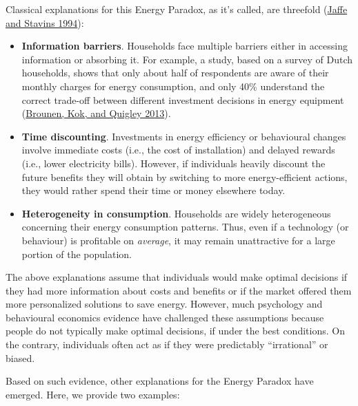 \documentclass[
  11pt,
  captions=heading]{scrreport}
\begin{document}
Classical explanations for this Energy Paradox, as it's called, are
threefold (\protect\hyperlink{ref-jaffe1994energy}{Jaffe and Stavins
1994}):

\begin{itemize}
\item
  \textbf{Information barriers}. Households face multiple barriers
  either in accessing information or absorbing it. For example, a study,
  based on a survey of Dutch households, shows that only about half of
  respondents are aware of their monthly charges for energy consumption,
  and only 40\% understand the correct trade-off between different
  investment decisions in energy equipment
  (\protect\hyperlink{ref-brounen2013energy}{Brounen, Kok, and Quigley
  2013}).
\item
  \textbf{Time discounting}. Investments in energy efficiency or
  behavioural changes involve immediate costs (i.e., the cost of
  installation) and delayed rewards (i.e., lower electricity bills).
  However, if individuals heavily discount the future benefits they will
  obtain by switching to more energy-efficient actions, they would
  rather spend their time or money elsewhere today.
\item
  \textbf{Heterogeneity in consumption}. Households are widely
  heterogeneous concerning their energy consumption patterns. Thus, even
  if a technology (or behaviour) is profitable on \emph{average}, it may
  remain unattractive for a large portion of the population.
\end{itemize}

The above explanations assume that individuals would make optimal
decisions if they had more information about costs and benefits or if
the market offered them more personalized solutions to save energy.
However, much psychology and behavioural economics evidence have
challenged these assumptions because people do not typically make
optimal decisions, if under the best conditions. On the contrary,
individuals often act as if they were predictably ``irrational'' or
biased.

Based on such evidence, other explanations for the Energy Paradox have
emerged. Here, we provide two examples:
\end{document}
